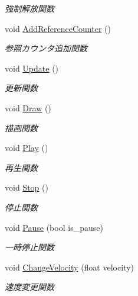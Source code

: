 \begin{DoxyCompactItemize}
\begin{DoxyCompactList}\small\item\em 強制解放関数 \end{DoxyCompactList}\item 
void \mbox{\hyperlink{class_effekseer_object_aeacb87988d36d3c255cbf53631ad715f}{Add\+Reference\+Counter}} ()
\begin{DoxyCompactList}\small\item\em 参照カウンタ追加関数 \end{DoxyCompactList}\item 
void \mbox{\hyperlink{class_effekseer_object_aecb9314a5ff922c9420301129d2f26f7}{Update}} ()
\begin{DoxyCompactList}\small\item\em 更新関数 \end{DoxyCompactList}\item 
void \mbox{\hyperlink{class_effekseer_object_adc628e5089ca0cdc418e92729943a3b2}{Draw}} ()
\begin{DoxyCompactList}\small\item\em 描画関数 \end{DoxyCompactList}\item 
void \mbox{\hyperlink{class_effekseer_object_a59c8a12b4eb558449622660d892b3cf4}{Play}} ()
\begin{DoxyCompactList}\small\item\em 再生関数 \end{DoxyCompactList}\item 
void \mbox{\hyperlink{class_effekseer_object_adfbdfbe202b78441b33d76656453e536}{Stop}} ()
\begin{DoxyCompactList}\small\item\em 停止関数 \end{DoxyCompactList}\item 
void \mbox{\hyperlink{class_effekseer_object_a01365c03b533af22fd1b9eee766d16ca}{Pause}} (bool is\+\_\+pause)
\begin{DoxyCompactList}\small\item\em 一時停止関数 \end{DoxyCompactList}\item 
void \mbox{\hyperlink{class_effekseer_object_a52c47feeb74058661f8db31a20a51dbf}{Change\+Velocity}} (float velocity)
\begin{DoxyCompactList}\small\item\em 速度変更関数 \end{DoxyCompactList}\item 

\end{DoxyCompactItemize}
